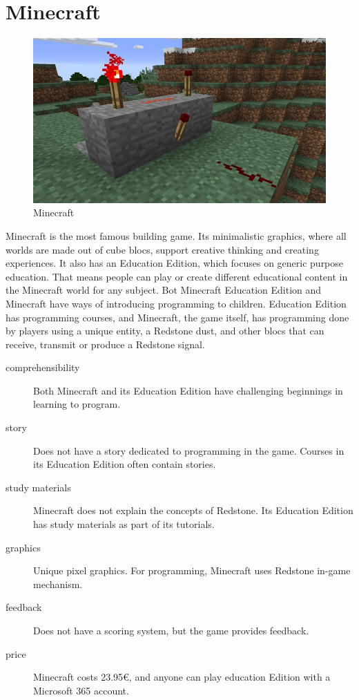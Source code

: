 \pagebreak
\section{Minecraft}
\label{similar-games:minecraft}

\begin{figure}
    \centering
    \includegraphics[width=1\linewidth]{assets/similar-games/minecraft.jpg}
    \caption{Minecraft~\cite{a2022_minecraft}}
    \label{fig:minecraft}
\end{figure}

Minecraft is the most famous building game.
Its minimalistic graphics, where all worlds are made out of cube blocs, support creative thinking and creating experiences.
It also has an Education Edition, which focuses on generic purpose education.
That means people can play or create different educational content in the Minecraft world for any subject.
Bot Minecraft Education Edition and Minecraft have ways of introducing programming to children.
Education Edition has programming courses, and Minecraft, the game itself, has programming done by players using a unique entity, a Redstone dust, and other blocs that can receive, transmit or produce a Redstone signal.

\begin{description}
    \item[comprehensibility] Both Minecraft and its Education Edition have challenging beginnings in learning to program.
    \item[story] Does not have a story dedicated to programming in the game. Courses in its Education Edition often contain stories.
    \item[study materials] Minecraft does not explain the concepts of Redstone. Its Education Edition has study materials as part of its tutorials.
    \item[graphics] Unique pixel graphics. For programming, Minecraft uses Redstone in-game mechanism.
    \item[feedback] Does not have a scoring system, but the game provides feedback.
    \item[price] Minecraft costs 23.95€, and anyone can play education Edition with a Microsoft 365 account.
\end{description}

